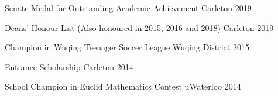 
\begin{cvhonors}

\cvaward
{Senate Medal for Outstanding Academic Achievement}
{Carleton}
{2019}

\cvaward
{Deans' Honour List (Also honoured in 2015, 2016 and 2018)}
{Carleton}
{2019}

\cvaward
{Champion in Wuqing Teenager Soccer League}
{Wuqing District}
{2015}

\cvaward
{Entrance Scholarship}
{Carleton}
{2014}

\cvaward
{School Champion in Euclid Mathematics Contest}
{uWaterloo}
{2014}



\end{cvhonors}


%
%
%
%
